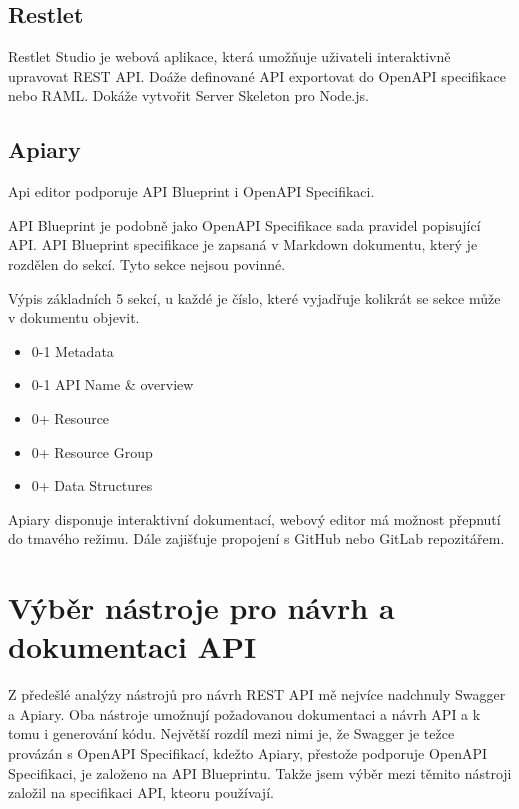 \documentclass[thesis=B,czech]{FITthesis}[2012/06/26]
\begin{document}
        \subsection{Restlet}
            Restlet Studio je webová aplikace, která umožňuje uživateli interaktivně upravovat REST API. Doáže definované API exportovat do OpenAPI specifikace nebo RAML. Dokáže vytvořit  Server Skeleton pro Node.js.
        \subsection{Apiary}
            Api editor podporuje API Blueprint i OpenAPI Specifikaci.
            
            API Blueprint je podobně jako OpenAPI Specifikace sada pravidel popisující API. API Blueprint specifikace je zapsaná v Markdown dokumentu, který je rozdělen do sekcí. Tyto sekce nejsou povinné.
            
            Výpis základních 5 sekcí, u každé je číslo, které vyjadřuje kolikrát se sekce může v dokumentu objevit.
            \begin{itemize} %
                \item 0-1 Metadata
                \item 0-1 API Name \& overview
                \item 0+ Resource
                \item 0+ Resource Group
                \item 0+ Data Structures
            \end{itemize}
            
            Apiary disponuje interaktivní dokumentací, webový editor má možnost přepnutí do tmavého režimu. Dále zajišťuje propojení s GitHub nebo GitLab repozitářem.

    \section{Výběr nástroje pro návrh a dokumentaci API}
        Z předešlé analýzy nástrojů pro návrh REST API mě nejvíce nadchnuly Swagger a Apiary. Oba nástroje umožnují požadovanou dokumentaci a návrh API a k tomu i generování kódu. Největší rozdíl mezi nimi je, že Swagger je težce provázán s OpenAPI Specifikací, kdežto Apiary, přestože podporuje OpenAPI Specifikaci, je založeno na API Blueprintu. Takže jsem výběr mezi těmito nástroji založil na specifikaci API, kteoru používají.
        
\end{document}
